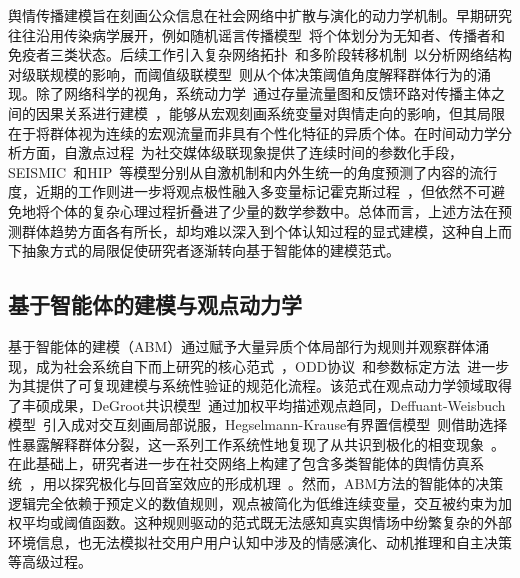 \documentclass[a4paper,fleqn]{cas-sc}
\begin{document}
舆情传播建模旨在刻画公众信息在社会网络中扩散与演化的动力学机制。早期研究往往沿用传染病学展开，例如随机谣言传播模型~\citep{daley_stochastic_1965}将个体划分为无知者、传播者和免疫者三类状态。后续工作引入复杂网络拓扑~\citep{watts_strogatz_1998,barabasi_albert_1999}和多阶段转移机制~\citep{jiang_weibo_spnr_2020}以分析网络结构对级联规模的影响，而阈值级联模型~\citep{granovetter_threshold_1978,watts_cascades_2002}则从个体决策阈值角度解释群体行为的涌现。除了网络科学的视角，系统动力学~\citep{forrester_industrial_1961,sterman_business_2000}通过存量流量图和反馈环路对传播主体之间的因果关系进行建模~\citep{gao_sd_public_opinion_2019,liu_evolution_2024}，能够从宏观刻画系统变量对舆情走向的影响，但其局限在于将群体视为连续的宏观流量而非具有个性化特征的异质个体。在时间动力学分析方面，自激点过程~\citep{hawkes_spectra_1971}为社交媒体级联现象提供了连续时间的参数化手段，SEISMIC~\citep{zhao_seismic_2015}和HIP~\citep{rizoiu_expecting_2017}等模型分别从自激机制和内外生统一的角度预测了内容的流行度，近期的工作则进一步将观点极性融入多变量标记霍克斯过程~\citep{zhang_opinion-aware_2023}，但依然不可避免地将个体的复杂心理过程折叠进了少量的数学参数中。总体而言，上述方法在预测群体趋势方面各有所长，却均难以深入到个体认知过程的显式建模，这种自上而下抽象方式的局限促使研究者逐渐转向基于智能体的建模范式。

\subsection{基于智能体的建模与观点动力学}

基于智能体的建模（ABM）通过赋予大量异质个体局部行为规则并观察群体涌现，成为社会系统自下而上研究的核心范式~\citep{bonabeau_agent-based_2002,macal_tutorial_2010}，ODD协议~\citep{grimm_odd_2010}和参数标定方法~\citep{mcculloch_calibrating_2022}进一步为其提供了可复现建模与系统性验证的规范化流程。该范式在观点动力学领域取得了丰硕成果，DeGroot共识模型~\citep{degroot_reaching_1974}通过加权平均描述观点趋同，Deffuant-Weisbuch模型~\citep{deffuant_mixing_2000}引入成对交互刻画局部说服，Hegselmann-Krause有界置信模型~\citep{hegselmann_opinion_2002}则借助选择性暴露解释群体分裂，这一系列工作系统性地复现了从共识到极化的相变现象~\citep{castellano_statistical_2009,bernardo_bc_survey_2024}。在此基础上，研究者进一步在社交网络上构建了包含多类智能体的舆情仿真系统~\citep{chen_evolution_2025,wu_public_2023}，用以探究极化与回音室效应的形成机理~\citep{liu_agent-based_2024,banisch_agent_2012,cinelli2021echo_ipm}。然而，ABM方法的智能体的决策逻辑完全依赖于预定义的数值规则，观点被简化为低维连续变量，交互被约束为加权平均或阈值函数。这种规则驱动的范式既无法感知真实舆情场中纷繁复杂的外部环境信息，也无法模拟社交用户用户认知中涉及的情感演化、动机推理和自主决策等高级过程。
\end{document}
